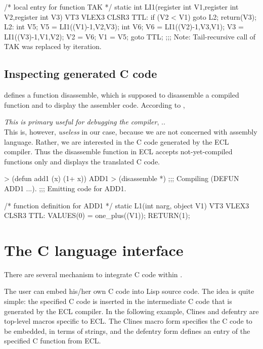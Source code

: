 \begin{example}
   /*      local entry for function TAK                                  */
   static int LI1(register int V1,register int V2,register int V3)
   { VT3 VLEX3 CLSR3
   TTL:
           if (V2 < V1) {
           goto L2;}
           return(V3);
   L2:
           { int V5;
             V5 = LI1((V1)-1,V2,V3);
           { int V6;
             V6 = LI1((V2)-1,V3,V1);
             V3 = LI1((V3)-1,V1,V2);
             V2 = V6;
             V1 = V5;}}
           goto TTL;
   ;;; Note: Tail-recursive call of TAK was replaced by iteration.
   }
\end{example}

\subsection{Inspecting generated C code}

\clisp{} defines a function disassemble, which is
supposed to disassemble a compiled function and to display the
assembler code.  According to \cltl{},

\vspace{1 em}

     {\em This is primary useful for debugging the compiler}, ..\\
 
This is, however, {\em useless} in our case, because we are
not concerned with assembly language.  Rather, we are interested in
the C code generated by the ECL compiler.  Thus the disassemble
function in ECL accepts not-yet-compiled functions only and displays
the translated C code.

\begin{example}
   > (defun add1 (x) (1+ x))
   ADD1
   > (disassemble *)
   ;;; Compiling (DEFUN ADD1 ...).
   ;;; Emitting code for ADD1.

   /*      function definition for ADD1                                  */
   static L1(int narg, object V1)
   { VT3 VLEX3 CLSR3
   TTL:
           VALUES(0) = one_plus((V1));
           RETURN(1);
   }
\end{example}

\section{The C language interface}

There are several mechanism to integrate C code within \ecl{}.

The user can embed his/her own C code into Lisp source code.  The
idea is quite simple: the specified C code is inserted in the intermediate
C code that is generated by the ECL compiler.  In the following example,
{\code Clines}  and {\code defentry}  are top-level macros specific
to ECL.  The {\code Clines}  macro form specifies the C code to be embedded,
in terms of strings, and the {\code defentry}  form defines an entry
of the specified C function from ECL.


